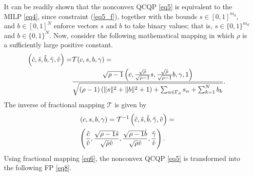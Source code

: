 \documentclass[smallextended,referee,envcountsect,,numbers]{svjour3}
\begin{document}
\noindent It can be readily shown that the nonconvex QCQP \eqref{eq5} is equivalent to the MILP \eqref{eq4}, since constraint (\ref{eq5_f}), together with the bounds $s\in {\left[0,1\right]}^{m_d}$, and $b \in [0,1]^N$ enforce vectors $s$ and $b$ to take binary values; that is, $s\in \{0,1\}^{m_d}$ and $b\in \{0,1\}^{N}$. Now, consider the following mathematical mapping in which $\rho$ is a sufficiently large positive constant. 
\begin{align} \label{eq6} 
\left(\hat{c},\hat{s},\hat{b},\hat{\gamma},\hat{v}\right)=&\mathcal{T}(c,s,b,\gamma)=\\
&\frac{\sqrt{\rho -1}\left(c,\frac{\sqrt{\rho }}{\sqrt{\rho -1}}s,\frac{\sqrt{\rho }}{\sqrt{\rho -1}}b,\gamma,1\right)}{\sqrt{\left(\rho -1\right)\left(\|s\|^2+\|b\|^2+1\right)+\sum_{\alpha \in \Gamma_d}{s_\alpha }+\sum_{k=1}^Nb_k}}. \notag
\end{align} 
The inverse of fractional mapping $\mathcal{T}$ is given by
\begin{align} \label{eq7} 
&\left(c,s,b,\gamma\right)={\mathcal{T}}^{-1}\left(\hat{c},\hat{s},\hat{b},\hat{\gamma},\hat{v}\right) = \notag \\ 
& \left(\frac{\hat{c}}{\hat{v}},\frac{\sqrt{\rho -1}\hat{s}}{\sqrt{\rho }\hat{v}},\frac{\sqrt{\rho -1}\hat{b}}{\sqrt{\rho }\hat{v}},\frac{\hat{\gamma}}{\hat{v}}\right). 
\end{align} 
Using fractional mapping \eqref{eq6}, the nonconvex QCQP \eqref{eq5} is transformed into the following FP \eqref{eq8}.
\end{document}
